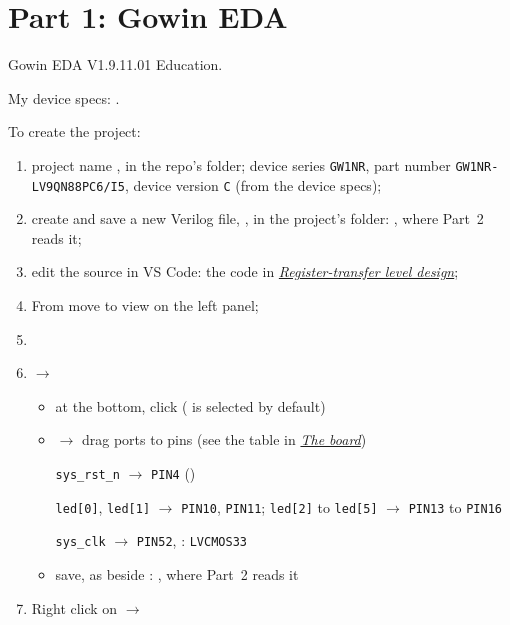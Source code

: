 \documentclass[11pt,a4paper]{article}
\begin{document}
\section*{Part 1: Gowin EDA}

Gowin EDA V1.9.11.01 Education.

My device specs: .

To create the project:

\begin{enumerate}
  \item project name , in the repo’s  folder; device series \texttt{GW1NR}, part number \texttt{GW1NR-LV9QN88PC6/I5}, device version \texttt{C} (from the device specs);
  \item create and save a new Verilog file, , in the project’s  folder: , where Part~2 reads it;
  \item edit the source in VS Code: the code in \hyperref[sec:design]{\emph{Register-transfer level design}};
  \item From  move to  view on the left panel;
  \item {}
  \item {} $\to$ 
  \begin{itemize}[nosep]
    \item at the bottom, click  ( is selected by default)
    \item {} $\to$ drag ports to pins (see the table in \hyperref[sec:board]{\emph{The board}})

      \texttt{sys\_rst\_n} $\to$ \texttt{PIN4} ()

      \texttt{led[0]}, \texttt{led[1]} $\to$ \texttt{PIN10}, \texttt{PIN11}; \texttt{led[2]} to \texttt{led[5]} $\to$ \texttt{PIN13} to \texttt{PIN16}

      \texttt{sys\_clk} $\to$ \texttt{PIN52}, : \texttt{LVCMOS33}
    \item save, as  beside : , where Part~2 reads it
  \end{itemize}
  \item Right click on  $\to$ 


\end{enumerate}
\end{document}
